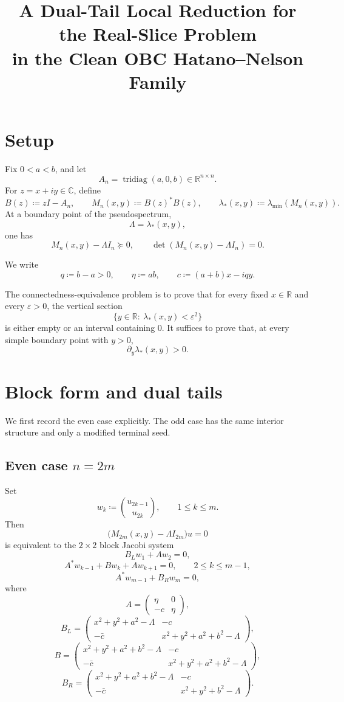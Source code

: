 \documentclass[11pt]{article}
\title{A Dual-Tail Local Reduction for the Real-Slice Problem\\
in the Clean OBC Hatano--Nelson Family}
\author{}
\date{}
\newcommand{\C}{\mathbb C}
\newcommand{\R}{\mathbb R}
\newcommand{\eps}{\varepsilon}
\begin{document}
\maketitle

\section{Setup}

Fix \(0<a<b\), and let
\[
A_n=\operatorname{tridiag}(a,0,b)\in\R^{n\times n}.
\]
For \(z=x+iy\in\C\), define
\[
B(z)\coloneqq zI-A_n,
\qquad
M_n(x,y)\coloneqq B(z)^*B(z),
\qquad
\lambda_*(x,y)\coloneqq \lambda_{\min}(M_n(x,y)).
\]
At a boundary point of the pseudospectrum,
\[
\Lambda=\lambda_*(x,y),
\]
one has
\[
M_n(x,y)-\Lambda I_n \succeq 0,
\qquad
\det(M_n(x,y)-\Lambda I_n)=0.
\]

We write
\[
q\coloneqq b-a>0,
\qquad
\eta\coloneqq ab,
\qquad
c\coloneqq (a+b)x-iqy.
\]

The connectedness-equivalence problem is to prove that for every fixed \(x\in\R\) and every
\(\eps>0\), the vertical section
\[
\{y\in\R:\ \lambda_*(x,y)<\eps^2\}
\]
is either empty or an interval containing \(0\). It suffices to prove that, at every simple
boundary point with \(y>0\),
\[
\partial_y \lambda_*(x,y)>0.
\]

\section{Block form and dual tails}

We first record the even case explicitly. The odd case has the same interior structure and only
a modified terminal seed.

\subsection*{Even case \(n=2m\)}

Set
\[
w_k\coloneqq \binom{u_{2k-1}}{u_{2k}},
\qquad
1\le k\le m.
\]
Then
\[
\bigl(M_{2m}(x,y)-\Lambda I_{2m}\bigr)u=0
\]
is equivalent to the \(2\times2\) block Jacobi system
\[
B_L w_1 + A w_2 = 0,
\]
\[
A^* w_{k-1}+Bw_k+Aw_{k+1}=0,
\qquad
2\le k\le m-1,
\]
\[
A^*w_{m-1}+B_R w_m=0,
\]
where
\[
A=
\begin{pmatrix}
\eta & 0\\
-c & \eta
\end{pmatrix},
\]
\[
B_L=
\begin{pmatrix}
x^2+y^2+a^2-\Lambda & -c\\
-\bar c & x^2+y^2+a^2+b^2-\Lambda
\end{pmatrix},
\]
\[
B=
\begin{pmatrix}
x^2+y^2+a^2+b^2-\Lambda & -c\\
-\bar c & x^2+y^2+a^2+b^2-\Lambda
\end{pmatrix},
\]
\[
B_R=
\begin{pmatrix}
x^2+y^2+a^2+b^2-\Lambda & -c\\
-\bar c & x^2+y^2+b^2-\Lambda
\end{pmatrix}.
\]
\end{document}
